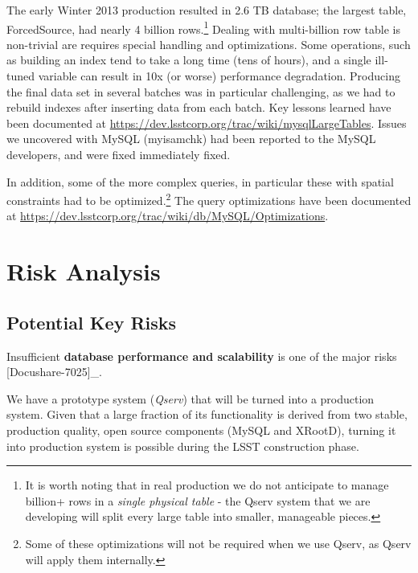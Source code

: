 \documentclass[DM,lsstdraft,toc]{lsstdoc}
\begin{document}
The early Winter 2013 production resulted in 2.6 TB database; the
largest table, ForcedSource, had nearly 4 billion rows.\footnote{It is
  worth noting that in real production we do not anticipate to manage
  billion+ rows in a \emph{single physical table} - the Qserv system
  that we are developing will split every large table into smaller,
  manageable pieces.} Dealing with multi-billion row table is
non-trivial are requires special handling and optimizations. Some
operations, such as building an index tend to take a long time (tens of
hours), and a single ill-tuned variable can result in 10x (or worse)
performance degradation. Producing the final data set in several batches
was in particular challenging, as we had to rebuild indexes after
inserting data from each batch. Key lessons learned have been documented
at \url{https://dev.lsstcorp.org/trac/wiki/mysqlLargeTables}. Issues we
uncovered with MySQL (myisamchk) had been reported to the MySQL
developers, and were fixed immediately fixed.

In addition, some of the more complex queries, in particular these with
spatial constraints had to be optimized.\footnote{Some of these
  optimizations will not be required when we use Qserv, as Qserv will
  apply them internally.} The query optimizations have been documented
at \url{https://dev.lsstcorp.org/trac/wiki/db/MySQL/Optimizations}.

\section{Risk Analysis}\label{risk-analysis}

\subsection{Potential Key Risks}\label{potential-key-risks}

Insufficient \textbf{database performance and scalability} is one of the
major risks {[}Docushare-7025{]}\_.

We have a prototype system (\emph{Qserv}) that will be turned into a
production system. Given that a large fraction of its functionality is
derived from two stable, production quality, open source components
(MySQL and XRootD), turning it into production
system is possible during the LSST construction phase.
\end{document}
